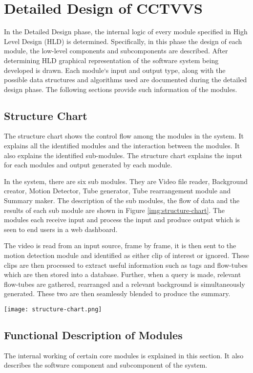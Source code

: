 \chapter{Detailed Design of CCTVVS}
In the Detailed Design phase, the internal logic of every module specified in
High Level Design (HLD) is determined. Specifically, in this phase the design
of each module, the low-level components and subcomponents are described. After
determining HLD graphical representation of the software system being developed
is drawn. Each module‘s input and output type, along with the possible data
structures and algorithms used are documented during the detailed design phase.
The following sections provide such information of the modules.

\section{Structure Chart}
The structure chart shows the control flow among the modules in the system. It
explains all the identified modules and the interaction between the modules. It
also explains the identified sub-modules. The structure chart explains the input
for each modules and output generated by each module.

In the system, there are six sub modules. They are Video file reader, Background
creator, Motion Detector, Tube generator, Tube rearrangement module and Summary
maker. The description of the sub modules, the flow of data and the results of
each sub module are shown in Figure \ref{img:structure-chart}. The modules each
receive input and process the input and produce output which is seen to end
users in a web dashboard.

The video is read from an input source, frame by frame, it is then sent to the
motion detection module and identified as either clip of interest or ignored.
These clips are then processed to extract useful information such as tags and
flow-tubes which are then stored into a database. Further, when a query is made,
relevant flow-tubes are gathered, rearranged and a relevant background is
simultaneously generated. These two are then seamlessly blended to produce the
summary.


\begin{sidewaysfigure}[H]
    \centering
    \texttt{[image: structure-chart.png]}
    \caption{Structure Chart}
    \label{img:structure-chart}
\end{sidewaysfigure}

\section{Functional Description of Modules}
The internal working of certain core modules is explained in this section. It
also describes the software component and subcomponent of the system.

